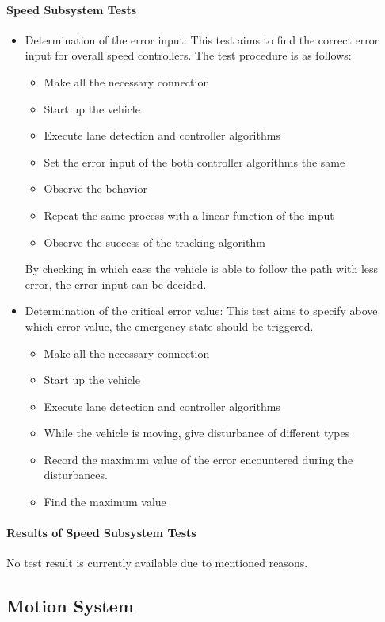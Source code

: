 \documentclass[a4paper,12pt]{article}
\begin{document}
	\paragraph{Speed Subsystem Tests}
	\begin{itemize}
		\item Determination of the error input: This test aims to find the correct error input for overall speed controllers. The test procedure is as follows:
		\begin{itemize}
			\item Make all the necessary connection
			\item Start up the vehicle
			\item Execute lane detection and controller algorithms
			\item Set the error input of the both controller algorithms the same
			\item Observe the behavior
			\item Repeat the same process with a linear function of the input
			\item Observe the success of the tracking algorithm
		\end{itemize}
		By checking in which case the vehicle is able to follow the path with less error, the error input can be decided.

		\item Determination of the critical error value: This test aims to specify above which error value, the emergency state should be triggered.
		\begin{itemize}
			\item Make all the necessary connection
			\item Start up the vehicle
			\item Execute lane detection and controller algorithms
			\item While the vehicle is moving, give disturbance of different types
			\item Record the maximum value of the error encountered during the disturbances.
			\item Find the maximum value
		\end{itemize}
		\end{itemize}
	\paragraph{Results of Speed Subsystem Tests}
	No test result is currently available due to mentioned reasons.

	\subsection{Motion System}
	
\end{document}
